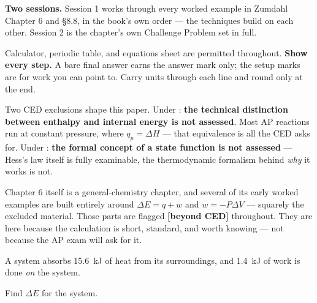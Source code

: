 \documentclass{apchem-exam}
\begin{document}
\apctitleblock

\begin{apcnote}
\textbf{Two sessions.} Session 1 works through every worked example in
Zumdahl Chapter 6 and \S8.8, in the book's own order --- the techniques
build on each other. Session 2 is the chapter's own Challenge Problem set
in full.

Calculator, periodic table, and equations sheet are permitted throughout.
\textbf{Show every step.} A bare final answer earns the answer mark only;
the setup marks are for work you can point to. Carry units through each
line and round only at the end.
\end{apcnote}

\begin{apcnote}
Two CED exclusions shape this paper. Under : \textbf{the
technical distinction between enthalpy and internal energy is not
assessed}. Most AP reactions run at constant pressure, where
$q_p = \Delta H$ --- that equivalence is all the CED asks for. Under
: \textbf{the formal concept of a state function is not
assessed} --- Hess's law itself is fully examinable, the thermodynamic
formalism behind \emph{why} it works is not.

Chapter 6 itself is a general-chemistry chapter, and several of its early
worked examples are built entirely around $\Delta E = q + w$ and $w =
-P\Delta V$ --- squarely the excluded material. Those parts are flagged
\textbf{[beyond CED]} throughout. They are here because the calculation is
short, standard, and worth knowing --- not because the AP exam will ask
for it.
\end{apcnote}



A system absorbs \SI{15.6}{\kilo\joule} of heat from its surroundings, and
\SI{1.4}{\kilo\joule} of work is done \emph{on} the system.

Find \(\Delta E\) for the system.
\workspace[3.5cm]
\end{document}
